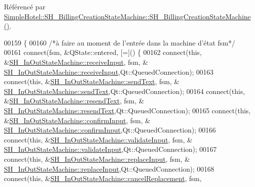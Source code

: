 Référencé par \hyperlink{classSimpleHotel_1_1SH__BillingCreationStateMachine_a8c7d39e11d0ced1fd9c27a5550465b86}{Simple\-Hotel\-::\-S\-H\-\_\-\-Billing\-Creation\-State\-Machine\-::\-S\-H\-\_\-\-Billing\-Creation\-State\-Machine()}.


\begin{DoxyCode}
00159 \{
00160     \textcolor{comment}{/*à faire au moment de l'entrée dans la machine d'état fsm*/}
00161     connect(fsm, &QState::entered, [=]() \{
00162         connect(\textcolor{keyword}{this}, &\hyperlink{classSimpleHotel_1_1SH__InOutStateMachine_a17482446bbf0327e84feb5d6a1a612f0}{SH\_InOutStateMachine::receiveInput}, fsm, &
      \hyperlink{classSimpleHotel_1_1SH__InOutStateMachine_a17482446bbf0327e84feb5d6a1a612f0}{SH\_InOutStateMachine::receiveInput},Qt::QueuedConnection);
00163         connect(\textcolor{keyword}{this}, &\hyperlink{classSimpleHotel_1_1SH__InOutStateMachine_ae81d4a51fcd3277ebfc11af978b74c0b}{SH\_InOutStateMachine::sendText}, fsm, &
      \hyperlink{classSimpleHotel_1_1SH__InOutStateMachine_ae81d4a51fcd3277ebfc11af978b74c0b}{SH\_InOutStateMachine::sendText},Qt::QueuedConnection);
00164         connect(\textcolor{keyword}{this}, &\hyperlink{classSimpleHotel_1_1SH__InOutStateMachine_a5db6f59d446182ab9f10e0ccb0399915}{SH\_InOutStateMachine::resendText}, fsm, &
      \hyperlink{classSimpleHotel_1_1SH__InOutStateMachine_a5db6f59d446182ab9f10e0ccb0399915}{SH\_InOutStateMachine::resendText},Qt::QueuedConnection);
00165         connect(\textcolor{keyword}{this}, &\hyperlink{classSimpleHotel_1_1SH__InOutStateMachine_a949cdb448f813f201b6ca827d1c860e9}{SH\_InOutStateMachine::confirmInput}, fsm, &
      \hyperlink{classSimpleHotel_1_1SH__InOutStateMachine_a949cdb448f813f201b6ca827d1c860e9}{SH\_InOutStateMachine::confirmInput},Qt::QueuedConnection);
00166         connect(\textcolor{keyword}{this}, &\hyperlink{classSimpleHotel_1_1SH__InOutStateMachine_a3754990c3f90bb7d59e5028d3d6504d8}{SH\_InOutStateMachine::validateInput}, fsm, &
      \hyperlink{classSimpleHotel_1_1SH__InOutStateMachine_a3754990c3f90bb7d59e5028d3d6504d8}{SH\_InOutStateMachine::validateInput},Qt::QueuedConnection);
00167         connect(\textcolor{keyword}{this}, &\hyperlink{classSimpleHotel_1_1SH__InOutStateMachine_a9117d781c5f8bc02d8b2eba359b0e85a}{SH\_InOutStateMachine::replaceInput}, fsm, &
      \hyperlink{classSimpleHotel_1_1SH__InOutStateMachine_a9117d781c5f8bc02d8b2eba359b0e85a}{SH\_InOutStateMachine::replaceInput},Qt::QueuedConnection);
00168         connect(\textcolor{keyword}{this}, &\hyperlink{classSimpleHotel_1_1SH__InOutStateMachine_abd6f8321716ad2f9a5e9d17cdedca275}{SH\_InOutStateMachine::cancelReplacement}, fsm,

\end{DoxyCode}
